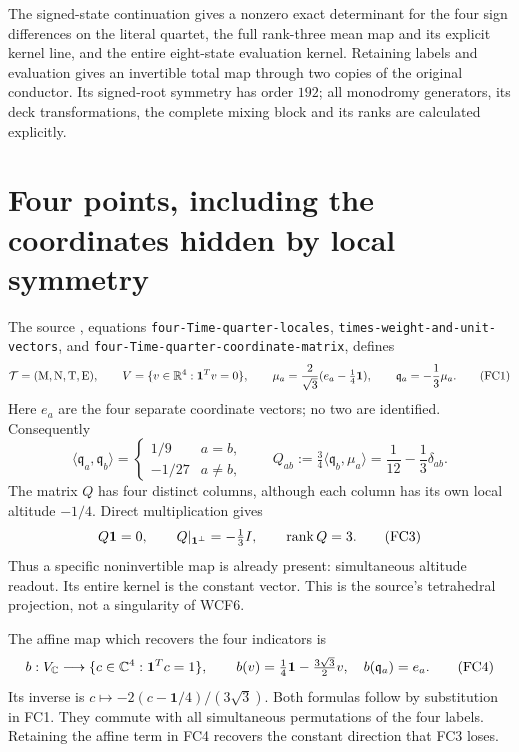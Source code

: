 The signed-state continuation gives a nonzero exact determinant for the
four sign differences on the literal quartet, the full rank-three mean
map and its explicit kernel line, and the entire eight-state evaluation
kernel. Retaining labels and evaluation gives an invertible total map
through two copies of the original conductor. Its signed-root symmetry
has order $192$; all monodromy generators, its deck transformations,
the complete mixing block and its ranks are calculated explicitly.

\section{Four points, including the coordinates hidden by local symmetry}
The source \cite{fullfable:ES}, equations \texttt{four-Time-quarter-locales},
\texttt{times-weight-and-unit-vectors}, and
\texttt{four-Time-quarter-coordinate-matrix}, defines
\[
 \mathcal T=(\mathrm M,\mathrm N,\mathrm T,\mathrm E),\qquad
 V=\{v\in\mathbb R^4:\mathbf1^Tv=0\},\qquad
 \mu_a=\frac2{\sqrt3}(e_a-\tfrac14\mathbf1),\qquad
 \mathfrak q_a=-\frac13\mu_a.
 \tag{FC1}
\]
Here $e_a$ are the four separate coordinate vectors; no two are identified.
Consequently
\[
 \langle\mathfrak q_a,\mathfrak q_b\rangle
 =\begin{cases}1/9&a=b,\\-1/27&a\ne b,\end{cases}
 \qquad
 Q_{ab}:=\tfrac34\langle\mathfrak q_b,\mu_a\rangle
 =\frac1{12}-\frac13\delta_{ab}.
 \tag{FC2}
\]
The matrix $Q$ has four distinct columns, although each column has its
own local altitude $-1/4$. Direct multiplication gives
\[
 Q\mathbf1=0,\qquad Q|_{\mathbf1^\perp}=-\tfrac13 I,
 \qquad \operatorname{rank} Q=3.
 \tag{FC3}
\]
Thus a specific noninvertible map is already present: simultaneous
altitude readout. Its entire kernel is the constant vector. This is the
source's tetrahedral projection, not a singularity of WCF6.

The affine map which recovers the four indicators is
\[
 b:V_{\mathbb C}\longrightarrow\{c\in\mathbb C^4:\mathbf1^Tc=1\},\qquad
 b(v)=\tfrac14\mathbf1-\tfrac{3\sqrt3}{2}v,
 \quad b(\mathfrak q_a)=e_a.
 \tag{FC4}
\]
Its inverse is $c\mapsto-2(c-\mathbf1/4)/(3\sqrt3)$.
Both formulas follow by substitution in FC1. They commute with all
simultaneous permutations of the four labels. Retaining the affine term
in FC4 recovers the constant direction that FC3 loses.

